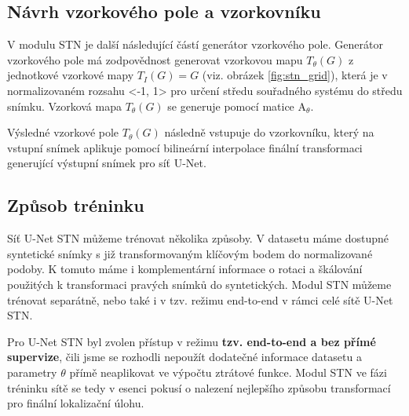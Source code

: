 \subsection{Návrh vzorkového pole a vzorkovníku}

V modulu STN je další následující částí generátor vzorkového pole. Generátor vzorkového pole má zodpovědnost generovat vzorkovou mapu $T_{\theta}(G)$ z jednotkové vzorkové mapy $T_{I}(G) = G$ (viz. obrázek \ref{fig:stn_grid}), která je v normalizovaném rozsahu <-1, 1> pro určení středu souřadného systému do středu snímku. Vzorková mapa $T_{\theta}(G)$ se generuje pomocí matice $\displaystyle \mathrm {A}_\theta$. 

Výsledné vzorkové pole $T_{\theta}(G)$ následně vstupuje do vzorkovníku, který na vstupní snímek aplikuje pomocí bilineární interpolace finální transformaci generující výstupní snímek pro síť U-Net.

\subsection{Způsob tréninku}

Síť U-Net STN můžeme trénovat několika způsoby. V datasetu máme dostupné syntetické snímky s již transformovaným klíčovým bodem do normalizované podoby. K tomuto máme i komplementární informace o rotaci a škálování použitých k transformaci pravých snímků do syntetických. Modul STN můžeme trénovat separátně, nebo také i v tzv. režimu end-to-end v rámci celé sítě U-Net STN.

Pro U-Net STN byl zvolen přístup v režimu \textbf{tzv. end-to-end a bez přímé supervize}, čili jsme se rozhodli nepoužít dodatečné informace datasetu a parametry $\theta$ přímě neaplikovat ve výpočtu ztrátové funkce. Modul STN ve fázi tréninku sítě se tedy v esenci pokusí o nalezení nejlepšího způsobu transformací pro finální lokalizační úlohu.

\endinput
